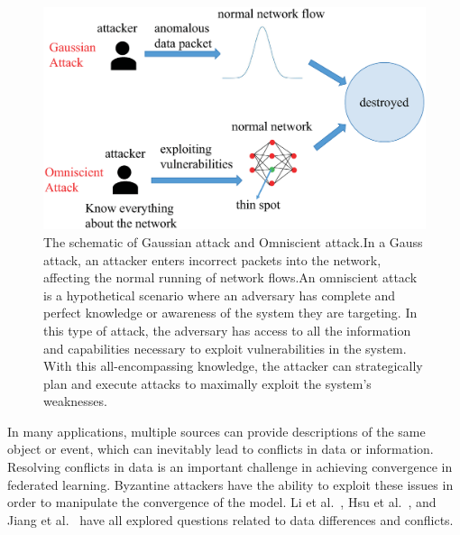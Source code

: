 \documentclass[pdflatex,sn-mathphys-num]{sn-jnl}%
\theoremstyle{thmstyleone}%
\theoremstyle{thmstyletwo}%
\theoremstyle{thmstylethree}%
\begin{document}
\begin{figure}[h]
	\centering
	\includegraphics[width=1.0\linewidth,height=3.5 in]{output/fig16.eps}
	\caption{The schematic of Gaussian attack and Omniscient attack.In
		a Gauss attack, an attacker enters incorrect packets into the network,
		affecting the normal running of network flows.An omniscient attack is
		a hypothetical scenario where an adversary has complete and perfect
		knowledge or awareness of the system they are targeting. In this
		type of attack, the adversary has access to all the information and
		capabilities necessary to exploit vulnerabilities in the system. With
		this all-encompassing knowledge, the attacker can strategically plan
		and execute attacks to maximally exploit the system’s weaknesses.}
	\label{fig16}
\end{figure}


In many applications, multiple sources can provide
descriptions of the same object or event, which can inevitably
lead to conflicts in data or information. Resolving conflicts
in data is an important challenge in achieving convergence
in federated learning. Byzantine attackers have the ability
to exploit these issues in order to manipulate the
convergence of the model. Li et al.~\cite{li2014resolving}, Hsu et al.~\cite{hsu2019measuring}, and
Jiang et al.~\cite{jiang2023secure} have all explored questions related to
data differences and conflicts.
\end{document}
